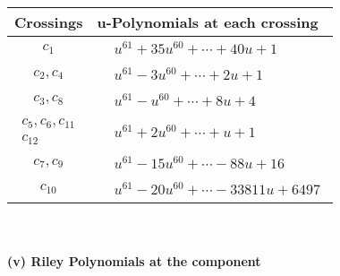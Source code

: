 \documentclass[1p]{elsarticle_modified}
\theoremstyle{definition}
\begin{document}
\begin{tabular}{m{50pt}|m{274pt}}
Crossings & \hspace{64pt}u-Polynomials at each crossing \\
\hline $$\begin{aligned}c_{1}\end{aligned}$$&$\begin{aligned}
&u^{61}+35 u^{60}+\cdots+40 u+1
\end{aligned}$\\
\hline $$\begin{aligned}c_{2},c_{4}\end{aligned}$$&$\begin{aligned}
&u^{61}-3 u^{60}+\cdots+2 u+1
\end{aligned}$\\
\hline $$\begin{aligned}c_{3},c_{8}\end{aligned}$$&$\begin{aligned}
&u^{61}- u^{60}+\cdots+8 u+4
\end{aligned}$\\
\hline $$\begin{aligned}c_{5},c_{6},c_{11}\\c_{12}\end{aligned}$$&$\begin{aligned}
&u^{61}+2 u^{60}+\cdots+u+1
\end{aligned}$\\
\hline $$\begin{aligned}c_{7},c_{9}\end{aligned}$$&$\begin{aligned}
&u^{61}-15 u^{60}+\cdots-88 u+16
\end{aligned}$\\
\hline $$\begin{aligned}c_{10}\end{aligned}$$&$\begin{aligned}
&u^{61}-20 u^{60}+\cdots-33811 u+6497
\end{aligned}$\\
\hline
\end{tabular}\\~\\
\newpage\renewcommand{\arraystretch}{1}
\flushleft \textbf{(v) Riley Polynomials at the component}\newline \\
\end{document}
